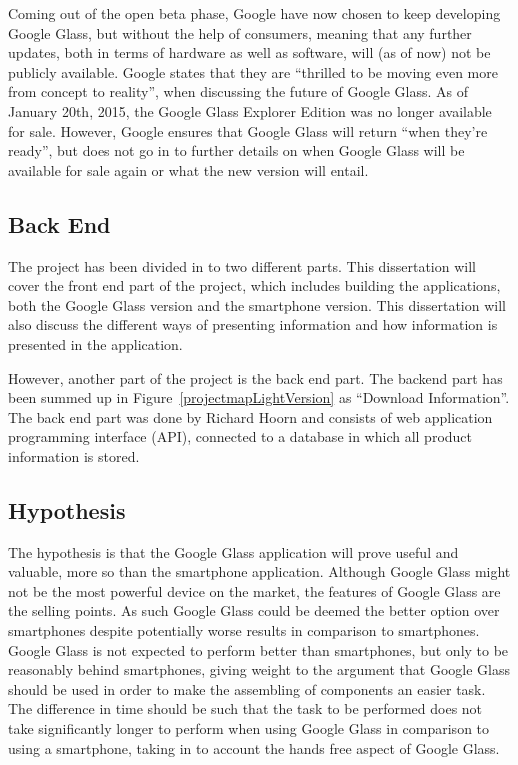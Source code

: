 Coming out of the open beta phase, Google have now chosen to keep developing Google Glass, but without the help of consumers, meaning that any further updates, both in terms of hardware as well as software, will (as of now) not be publicly available. Google states that they are ``thrilled to be moving even more from concept to reality'', when discussing the future of Google Glass. As of January 20th, 2015, the Google Glass Explorer Edition was no longer available for sale. However, Google ensures that Google Glass will return ``when they're ready'', but does not go in to further details on when Google Glass will be available for sale again or what the new version will entail. 

\subsection{Back End}
The project has been divided in to two different parts. This dissertation will cover the front end part of the project, which includes building the applications, both the Google Glass version and the smartphone version. This dissertation will also discuss the different ways of presenting information and how information is presented in the application.

However, another part of the project is the back end part. The backend part has been summed up in Figure~\ref{projectmapLightVersion} as ``Download Information''. The back end part was done by Richard Hoorn and consists of web application programming interface (API), connected to a database in which all product information is stored. 

\subsection{Hypothesis}
The hypothesis is that the Google Glass application will prove useful and valuable, more so than the smartphone application. Although Google Glass might not be the most powerful device on the market, the features of Google Glass are the selling points. As such Google Glass could be deemed the better option over smartphones despite potentially worse results in comparison to smartphones. Google Glass is not expected to perform better than smartphones, but only to be reasonably behind smartphones, giving weight to the argument that Google Glass should be used in order to make the assembling of components an easier task. The difference in time should be such that the task to be performed does not take significantly longer to perform when using Google Glass in comparison to using a smartphone, taking in to account the hands free aspect of Google Glass.

